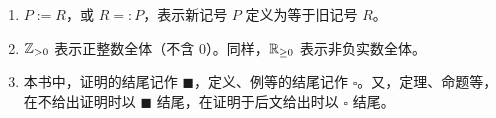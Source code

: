 \begin{enumerate}[label=(\arabic*),leftmargin=2.6em,itemsep=2pt,topsep=2pt]
\item $P:=R$，或 $R=:P$，表示新记号 $P$ 定义为等于旧记号 $R$。

\item $\mathbb{Z}_{>0}$ 表示正整数全体（不含 $0$）。同样，$\mathbb{R}_{\ge 0}$ 表示非负实数全体。

\item 本书中，证明的结尾记作 $\blacksquare$，定义、例等的结尾记作 $\square$。又，定理、命题等，在不给出证明时以 $\blacksquare$ 结尾，在证明于后文给出时以 $\square$ 结尾。
\end{enumerate}
